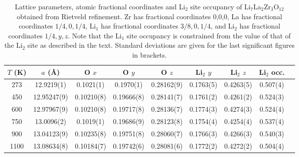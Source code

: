 \documentclass[twoside,twocolumn,9pt]{article}
\begin{document}
\begin{table}[t]
\centering
\caption{Lattice parameters, atomic fractional coordinates and Li$_2$ site occupancy of Li$_7$La$_2$Zr$_3$O$_{12}$ obtained from Rietveld refinement. Zr has fractional coordinates 0,0,0, La has fractional coordinates $1/4,0,1/4$, Li$_1$ has fractional coordinates $3/8,0,1/4$, and Li$_2$ has fractional coordinates $1/4,y,z$. Note that the Li$_1$ site occupancy is constrained from the value of that of the Li$_2$ site as described in the text. Standard deviations are given for the last significant figures in brackets. }
\label{tab:Rietveld_structure}
\begin{tabular}{ccccccccc}
\hline
\hline
$T$ (K)  & $a$ (\AA) & O $x$        & O $y$        & O $z$        &  Li$_2$ $y$       & Li$_2$ $z$ & Li$_2$ occ. \\
\hline
273  & 12.9219(1)    & 0.1021(1)      & 0.1970(1)      & 0.28162(9)     & 0.1763(5)           & 0.4263(5)    & 0.507(4) \\
450  & 12.95247(9)   & 0.10210(8)     & 0.19666(8)     & 0.28141(7)     & 0.1761(2)           & 0.4261(2)    & 0.524(3) \\
600  & 12.97967(9)   & 0.10210(8)     & 0.19717(8)     & 0.28136(7)     & 0.1774(3)           & 0.4274(3)    & 0.524(4) \\
750  & 13.0096(2)    & 0.1019(1)      & 0.19686(9)     & 0.28123(8)     & 0.1754(4)           & 0.4254(4)    & 0.537(4) \\
900  & 13.04123(9)   & 0.10235(8)     & 0.19751(8)     & 0.28060(7)     & 0.1766(3)           & 0.4266(3)    & 0.540(3) \\
1100 & 13.08634(8)   & 0.10184(7)     & 0.19742(6)     & 0.28081(6)     & 0.1772(2)           & 0.4272(2)    & 0.504(4) \\
\hline
\hline
\end{tabular}
\end{table}
\end{document}
